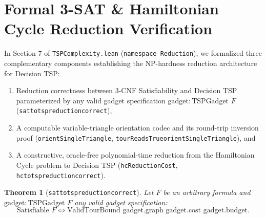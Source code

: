 \documentclass[11pt,a4paper]{article}
\renewcommand{\_}{\origunderscore\allowbreak}
\theoremstyle{plain}
\newtheorem{theorem}{Theorem}[section]
\theoremstyle{definition}
\theoremstyle{remark}
\begin{document}
\section{Formal 3-SAT \& Hamiltonian Cycle Reduction Verification}

In Section 7 of \texttt{TSP\allowbreak Complexity.\allowbreak lean} (\texttt{namespace Reduction}), we formalized three complementary components establishing the NP-hardness reduction architecture for Decision TSP:
\begin{enumerate}
  \item Reduction correctness between 3-CNF Satisfiability and Decision TSP parameterized by any valid gadget specification $\text{gadget} : \text{TSPGadget } F$ (\texttt{sat\_to\_tsp\_reduction\_correct}),
  \item A computable variable-triangle orientation codec and its round-trip inversion proof (\texttt{orient\allowbreak Single\allowbreak Triangle}, \texttt{tourReadsTrue\_orientSingleTriangle}), and
  \item A constructive, oracle-free polynomial-time reduction from the Hamiltonian Cycle problem to Decision TSP (\texttt{hcReductionCost}, \texttt{hc\_to\_tsp\_reduction\_correct}).
\end{enumerate}

\begin{theorem}[\texttt{sat\_to\_tsp\_reduction\_correct}]
Let $F$ be an arbitrary formula and $\text{gadget} : \text{TSPGadget } F$ any valid gadget specification:
\begin{equation*}
  \text{Satisfiable } F \iff \text{ValidTourBound gadget.graph gadget.cost gadget.budget}.
\end{equation*}
\end{theorem}
\end{document}

